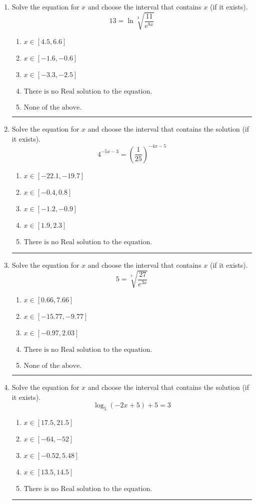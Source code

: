 \documentclass[14pt]{extbook}
\newcommand{\litem}[1]{\item#1\hspace*{-1cm}\rule{\textwidth}{0.4pt}}
\begin{document}
\begin{enumerate}
{\begin{enumerate}[label=\Alph*.]
\end{enumerate} }
\litem{
 Solve the equation for $x$ and choose the interval that contains $x$ (if it exists).\[  13 = \ln{\sqrt[3]{\frac{11}{e^{8x}}}} \]\begin{enumerate}[label=\Alph*.]
\item \( x \in [4.5, 6.6] \)
\item \( x \in [-1.6, -0.6] \)
\item \( x \in [-3.3, -2.5] \)
\item \( \text{There is no Real solution to the equation.} \)
\item \( \text{None of the above.} \)

\end{enumerate} }
\litem{
Solve the equation for $x$ and choose the interval that contains the solution (if it exists).\[ 4^{-5x-3} = \left(\frac{1}{25}\right)^{-4x-5} \]\begin{enumerate}[label=\Alph*.]
\item \( x \in [-22.1, -19.7] \)
\item \( x \in [-0.4, 0.8] \)
\item \( x \in [-1.2, -0.9] \)
\item \( x \in [1.9, 2.3] \)
\item \( \text{There is no Real solution to the equation.} \)

\end{enumerate} }
\litem{
 Solve the equation for $x$ and choose the interval that contains $x$ (if it exists).\[  5 = \sqrt[7]{\frac{27}{e^{3x}}} \]\begin{enumerate}[label=\Alph*.]
\item \( x \in [0.66, 7.66] \)
\item \( x \in [-15.77, -9.77] \)
\item \( x \in [-0.97, 2.03] \)
\item \( \text{There is no Real solution to the equation.} \)
\item \( \text{None of the above.} \)

\end{enumerate} }
\litem{
Solve the equation for $x$ and choose the interval that contains the solution (if it exists).\[ \log_{5}{(-2x+5)}+5 = 3 \]\begin{enumerate}[label=\Alph*.]
\item \( x \in [17.5, 21.5] \)
\item \( x \in [-64, -52] \)
\item \( x \in [-0.52, 5.48] \)
\item \( x \in [13.5, 14.5] \)
\item \( \text{There is no Real solution to the equation.} \)


\end{enumerate}}
\end{enumerate}
\end{document}
